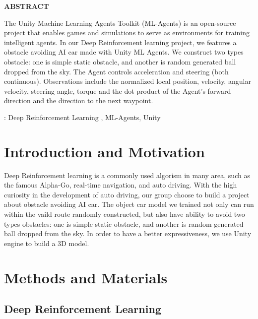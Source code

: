 \documentclass[12pt,a4paper,oneside]{book}
\theoremstyle{plain}
\numberwithin{equation}{chapter} \DeclareMathOperator{\Var}{Var}
\begin{document}
\begin{center}
  \large{\textbf{ABSTRACT}}\\
\end{center}
The Unity Machine Learning Agents Toolkit (ML-Agents) is an open-source project that enables games and simulations to serve as environments for training intelligent agents. In our Deep Reinforcement learning project, we features a obstacle avoiding AI car made with Unity ML Agents. We construct two types obstacle: one is simple static obstacle, and another is random generated ball dropped from the sky. The Agent controls acceleration and steering (both continuous). Observations include the normalized local position, velocity, angular velocity, steering angle, torque and the dot product of the Agent's forward direction and the direction to the next waypoint. 


 : Deep Reinforcement Learning , ML-Agents, Unity 


\newpage

\tableofcontents
%


\newpage

\chapter{Introduction and Motivation}
\setlength{\parindent}{0pt}
Deep Reinforcement learning is a commonly used algorism in many area, such as the famous Alpha-Go, real-time navigation, and auto driving. With the high curiosity in the development of auto driving, our group choose to build a project about obstacle avoiding AI car. The object car model we trained not only can run within the vaild route randomly constructed, but also have ability to avoid two types obstacles: one is simple static obstacle, and another is random generated ball dropped from the sky. In order to have a better expressiveness, we use Unity engine to build a 3D model. 


\newpage
\chapter{Methods and Materials}

\section{Deep Reinforcement Learning }\label{Sec2.1}
\end{document}
